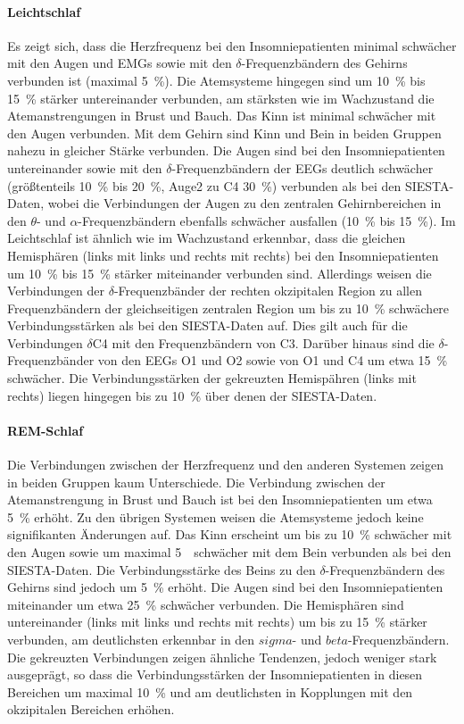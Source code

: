 \paragraph{Leichtschlaf} Es zeigt sich, dass die Herzfrequenz bei den Insomniepatienten minimal schwächer mit den Augen und \acs{EMG}s sowie mit den $\delta$-Frequenzbändern des Gehirns verbunden ist (maximal 5~\%). Die Atemsysteme hingegen sind um 10~\% bis 15~\% stärker untereinander verbunden, am stärksten wie im Wachzustand die Atemanstrengungen in Brust und Bauch. Das Kinn ist minimal schwächer mit den Augen verbunden. Mit dem Gehirn sind Kinn und Bein in beiden Gruppen nahezu in gleicher Stärke verbunden. Die Augen sind bei den Insomniepatienten untereinander sowie mit den $\delta$-Frequenzbändern der \acs{EEG}s deutlich schwächer (größtenteils 10~\% bis 20~\%, Auge2 zu C4 30~\%) verbunden als bei den SIESTA-Daten, wobei die Verbindungen der Augen zu den zentralen Gehirnbereichen in den $\theta$- und $\alpha$-Frequenzbändern ebenfalls schwächer ausfallen (10~\% bis 15~\%). Im Leichtschlaf ist ähnlich wie im Wachzustand erkennbar, dass die gleichen Hemisphären (links mit links und rechts mit rechts) bei den Insomniepatienten um 10~\% bis 15~\% stärker miteinander verbunden sind. Allerdings weisen die Verbindungen der $\delta$-Frequenzbänder der rechten okzipitalen Region zu allen Frequenzbändern der gleichseitigen zentralen Region um bis zu 10~\% schwächere Verbindungsstärken als bei den SIESTA-Daten auf. Dies gilt auch für die Verbindungen $\delta$C4 mit den Frequenzbändern von C3. Darüber hinaus sind die $\delta$-Frequenzbänder von den \acs{EEG}s O1 und O2 sowie von O1 und C4 um etwa 15~\% schwächer. Die Verbindungsstärken der gekreuzten Hemispähren (links mit rechts) liegen hingegen bis zu 10~\% über denen der SIESTA-Daten.

\paragraph{\acs{REM}-Schlaf} Die Verbindungen zwischen der Herzfrequenz und den anderen Systemen zeigen in beiden Gruppen kaum Unterschiede. Die Verbindung zwischen der Atemanstrengung in Brust und Bauch ist bei den Insomniepatienten um etwa 5~\% erhöht. Zu den übrigen Systemen weisen die Atemsysteme jedoch keine signifikanten Änderungen auf. Das Kinn erscheint um bis zu 10~\% schwächer mit den Augen sowie um maximal 5~\ schwächer mit dem Bein verbunden als bei den SIESTA-Daten. Die Verbindungsstärke des Beins zu den $\delta$-Frequenzbändern des Gehirns sind jedoch um 5~\% erhöht. Die Augen sind bei den Insomniepatienten miteinander um etwa 25~\% schwächer verbunden. Die Hemisphären sind untereinander (links mit links und rechts mit rechts) um bis zu 15~\% stärker verbunden, am deutlichsten erkennbar in den $sigma$- und $beta$-Frequenzbändern. Die gekreuzten Verbindungen  zeigen ähnliche Tendenzen, jedoch weniger stark ausgeprägt, so dass die Verbindungsstärken der Insomniepatienten in diesen Bereichen um maximal 10~\% und am deutlichsten in Kopplungen mit den okzipitalen Bereichen erhöhen.

